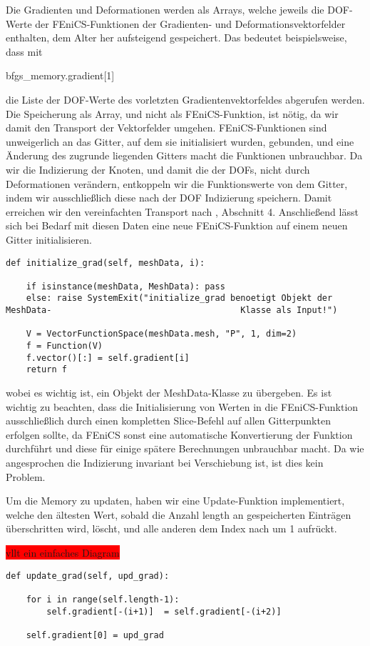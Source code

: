 Die Gradienten und Deformationen werden als Arrays, welche jeweils die DOF-Werte der FEniCS-Funktionen der Gradienten- und Deformationsvektorfelder enthalten, dem Alter her aufsteigend gespeichert. Das bedeutet beispielsweise, dass mit 
\begin{center}
	\textsf{bfgs\_memory.gradient[1]}
\end{center} 
die Liste der DOF-Werte des vorletzten Gradientenvektorfeldes abgerufen werden. Die Speicherung als Array, und nicht als FEniCS-Funktion, ist nötig, da wir damit den Transport der Vektorfelder umgehen. FEniCS-Funktionen sind unweigerlich an das Gitter, auf dem sie initialisiert wurden, gebunden, und eine Änderung des zugrunde liegenden Gitters macht die Funktionen unbrauchbar. Da wir die Indizierung der Knoten, und damit die der DOFs, nicht durch Deformationen verändern, entkoppeln wir die Funktionswerte von dem Gitter, indem wir ausschließlich diese nach der DOF Indizierung speichern. Damit erreichen wir den vereinfachten Transport nach \cite{diffusion}, Abschnitt 4. 
Anschließend  lässt sich bei Bedarf mit diesen Daten eine neue FEniCS-Funktion auf einem neuen Gitter initialisieren.
\begin{lstlisting}
def initialize_grad(self, meshData, i):

    if isinstance(meshData, MeshData): pass
    else: raise SystemExit("initialize_grad benoetigt Objekt der MeshData-			 						   Klasse als Input!")

    V = VectorFunctionSpace(meshData.mesh, "P", 1, dim=2)
    f = Function(V)
    f.vector()[:] = self.gradient[i]
    return f
\end{lstlisting}
wobei es wichtig ist, ein Objekt der \textsf{MeshData}-Klasse zu übergeben. Es ist wichtig zu beachten, dass die Initialisierung von Werten in die FEniCS-Funktion ausschließlich durch einen kompletten Slice-Befehl auf allen Gitterpunkten erfolgen sollte, da FEniCS sonst eine automatische Konvertierung der Funktion durchführt und diese für einige spätere Berechnungen unbrauchbar macht. Da wie angesprochen die Indizierung invariant bei Verschiebung ist, ist dies kein Problem.

Um die Memory zu updaten, haben wir eine Update-Funktion implementiert, welche 
den ältesten Wert, sobald die Anzahl \textsf{length} an gespeicherten Einträgen überschritten wird, löscht, und alle anderen dem Index nach um 1 aufrückt. 

\colorbox{red}{ vllt ein einfaches Diagram}

\begin{lstlisting}
def update_grad(self, upd_grad):
    
    for i in range(self.length-1): 
      	self.gradient[-(i+1)]  = self.gradient[-(i+2)]
    
    self.gradient[0] = upd_grad
\end{lstlisting}

